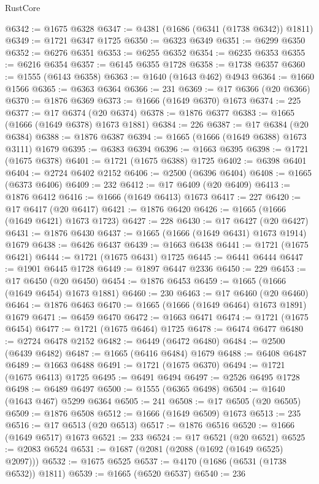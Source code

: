 \begin{lexlean}{RustCore}
\begin{coremodule}
@6342 := @1675 @6328
@6347 := @4381 (@1686 (@6341 (@1738 @6342)) @1811)
@6349 := @1721 @6347 @1725
@6350 := @6323 @6349
@6351 := @6299 @6350
@6352 := @6276 @6351
@6353 := @6255 @6352
@6354 := @6235 @6353
@6355 := @6216 @6354
@6357 := @6145 @6355 @1728
@6358 := @1738 @6357
@6360 := @1555 (@6143 @6358)
@6363 := @1640 (@1643 @462) @4943
@6364 := @1660 @1566
@6365 := @6363 @6364
@6366 := 231
@6369 := @17 @6366 (@20 @6366)
@6370 := @1876 @6369
@6373 := @1666 (@1649 @6370) @1673
@6374 := 225
@6377 := @17 @6374 (@20 @6374)
@6378 := @1876 @6377
@6383 := @1665 (@1666 (@1649 @6378) @1673 @1881)
@6384 := 226
@6387 := @17 @6384 (@20 @6384)
@6388 := @1876 @6387
@6394 := @1665 (@1666 (@1649 @6388) @1673 @3111) @1679
@6395 := @6383 @6394
@6396 := @1663 @6395
@6398 := @1721 (@1675 @6378)
@6401 := @1721 (@1675 @6388) @1725
@6402 := @6398 @6401
@6404 := @2724 @6402 @2152
@6406 := @2500 (@6396 @6404)
@6408 := @1665 (@6373 @6406)
@6409 := 232
@6412 := @17 @6409 (@20 @6409)
@6413 := @1876 @6412
@6416 := @1666 (@1649 @6413) @1673
@6417 := 227
@6420 := @17 @6417 (@20 @6417)
@6421 := @1876 @6420
@6426 := @1665 (@1666 (@1649 @6421) @1673 @1723)
@6427 := 228
@6430 := @17 @6427 (@20 @6427)
@6431 := @1876 @6430
@6437 := @1665 (@1666 (@1649 @6431) @1673 @1914) @1679
@6438 := @6426 @6437
@6439 := @1663 @6438
@6441 := @1721 (@1675 @6421)
@6444 := @1721 (@1675 @6431) @1725
@6445 := @6441 @6444
@6447 := @1901 @6445 @1728
@6449 := @1897 @6447 @2336
@6450 := 229
@6453 := @17 @6450 (@20 @6450)
@6454 := @1876 @6453
@6459 := @1665 (@1666 (@1649 @6454) @1673 @1881)
@6460 := 230
@6463 := @17 @6460 (@20 @6460)
@6464 := @1876 @6463
@6470 := @1665 (@1666 (@1649 @6464) @1673 @1891) @1679
@6471 := @6459 @6470
@6472 := @1663 @6471
@6474 := @1721 (@1675 @6454)
@6477 := @1721 (@1675 @6464) @1725
@6478 := @6474 @6477
@6480 := @2724 @6478 @2152
@6482 := @6449 (@6472 @6480)
@6484 := @2500 (@6439 @6482)
@6487 := @1665 (@6416 @6484) @1679
@6488 := @6408 @6487
@6489 := @1663 @6488
@6491 := @1721 (@1675 @6370)
@6494 := @1721 (@1675 @6413) @1725
@6495 := @6491 @6494
@6497 := @2526 @6495 @1728
@6498 := @6489 @6497
@6500 := @1555 (@6365 @6498)
@6504 := @1640 (@1643 @467) @5299 @6364
@6505 := 241
@6508 := @17 @6505 (@20 @6505)
@6509 := @1876 @6508
@6512 := @1666 (@1649 @6509) @1673
@6513 := 235
@6516 := @17 @6513 (@20 @6513)
@6517 := @1876 @6516
@6520 := @1666 (@1649 @6517) @1673
@6521 := 233
@6524 := @17 @6521 (@20 @6521)
@6525 := @2083 @6524
@6531 := @1687 (@2081 (@2088 (@1692 (@1649 @6525) @2097)))
@6532 := @1675 @6525
@6537 := @4170 (@1686 (@6531 (@1738 @6532)) @1811)
@6539 := @1665 (@6520 @6537)
@6540 := 236

\end{coremodule}
\end{lexlean}
